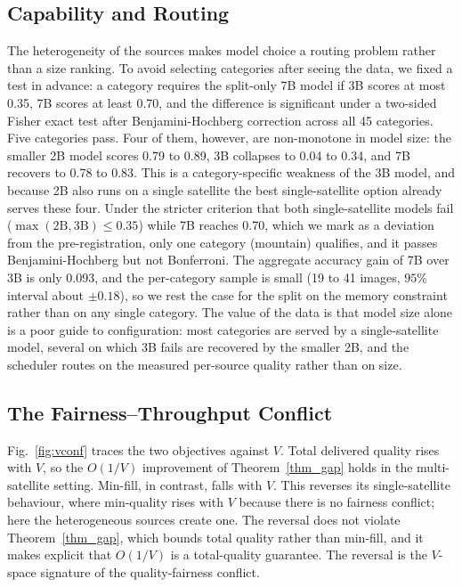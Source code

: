 \subsection{Capability and Routing}\label{EV_ROUTE}
The heterogeneity of the sources makes model choice a routing problem rather than a
size ranking. To avoid selecting categories after seeing the data, we fixed a test
in advance: a category requires the split-only 7B model if 3B scores at most 0.35,
7B scores at least 0.70, and the difference is significant under a two-sided Fisher
exact test after Benjamini-Hochberg correction across all 45 categories. Five
categories pass. Four of them, however, are non-monotone in model size: the smaller
2B model scores 0.79 to 0.89, 3B collapses to 0.04 to 0.34, and 7B recovers to 0.78
to 0.83. This is a category-specific weakness of the 3B model, and because 2B also
runs on a single satellite the best single-satellite option already serves these
four. Under the stricter criterion that both single-satellite models fail
($\max(\text{2B},\text{3B})\le 0.35$) while 7B reaches 0.70, which we mark as a
deviation from the pre-registration, only one category (mountain) qualifies, and it
passes Benjamini-Hochberg but not Bonferroni. The aggregate accuracy gain of 7B
over 3B is only 0.093, and the per-category sample is small (19 to 41 images,
$95\%$ interval about $\pm0.18$), so we rest the case for the split on the memory
constraint rather than on any single category. The value of the data is that model
size alone is a poor guide to configuration: most categories are served by a
single-satellite model, several on which 3B fails are recovered by the smaller 2B,
and the scheduler routes on the measured per-source quality rather than on size.

\subsection{The Fairness--Throughput Conflict}\label{EV_VCONF}
Fig.~\ref{fig:vconf} traces the two objectives against $V$. Total delivered quality
rises with $V$, so the $O(1/V)$ improvement of Theorem~\ref{thm_gap} holds in the
multi-satellite setting. Min-fill, in contrast, falls with $V$. This reverses its
single-satellite behaviour, where min-quality rises with $V$ because there is no
fairness conflict; here the heterogeneous sources create one. The reversal does not
violate Theorem~\ref{thm_gap}, which bounds total quality rather than min-fill, and
it makes explicit that $O(1/V)$ is a total-quality guarantee. The reversal is the
$V$-space signature of the quality-fairness conflict.

